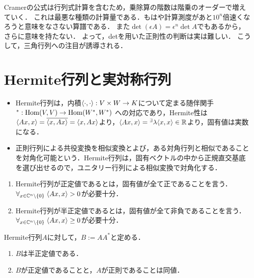\documentclass[uplatex, dvipdfmx]{jsreport}
\begin{document}
\begin{tcolorbox}[colframe=ForestGreen, colback=ForestGreen!10!white,breakable,colbacktitle=ForestGreen!40!white,coltitle=black,fonttitle=\bfseries\sffamily,
title=計算量の世界：三角行列への注目]
    Cramerの公式は行列式計算を含むため，乗除算の階数は階乗のオーダーで増えていく．
    これは最悪な種類の計算量である．もはや計算測度があと$10^n$倍速くなろうと意味をなさない算譜である．
    また$\det(\epsilon A)=\epsilon^n\det A$でもあるから，さらに意味を持たない．
    よって，detを用いた正則性の判断は実は難しい．
    こうして，三角行列への注目が誘導される．
\end{tcolorbox}

\section{Hermite行列と実対称行列}

\begin{tcolorbox}[colframe=ForestGreen, colback=ForestGreen!10!white,breakable,colbacktitle=ForestGreen!40!white,coltitle=black,fonttitle=\bfseries\sffamily,
title=]
    \begin{itemize}
        \item Hermite行列は，内積$\langle\cdot,\cdot\rangle:V\times W\to K$について定まる随伴関手${}^*:\mathrm{Hom}(V,V)\to\mathrm{Hom}(W^*,W^*)$
        への対応であり，Hermite性は$\langle Ax,x\rangle=\overline{\langle x,Ax\rangle}=\langle x,Ax\rangle$より，$\langle Ax,x\rangle={}^\exists\lambda\langle x,x\rangle\in\mathbb{R}$より，固有値は実数になる．
        \item 正則行列による共役変換を相似変換とよび，ある対角行列と相似であることを対角化可能という．Hermite行列は，固有ベクトルの中から正規直交基底を選び出せるので，ユニタリー行列による相似変換で対角化する．
    \end{itemize}
\end{tcolorbox}

\begin{definition}\mbox{}
    \begin{enumerate}
        \item Hermite行列が正定値であるとは，固有値が全て正であることを言う．$\forall_{x\in\mathbb{C}^n\setminus\{0\}}\;\langle Ax,x\rangle>0$が必要十分．
        \item Hermite行列が半正定値であるとは，固有値が全て非負であることを言う．$\forall_{x\in\mathbb{C}^n\setminus\{0\}}\;\langle Ax,x\rangle\ge 0$が必要十分．
    \end{enumerate}
\end{definition}

\begin{lemma}
    Hermite行列$A$に対して，$B:=AA^*$と定める．
    \begin{enumerate}
        \item $B$は半正定値である．
        \item $B$が正定値であることと，$A$が正則であることは同値．
    \end{enumerate}
\end{lemma}
\end{document}
